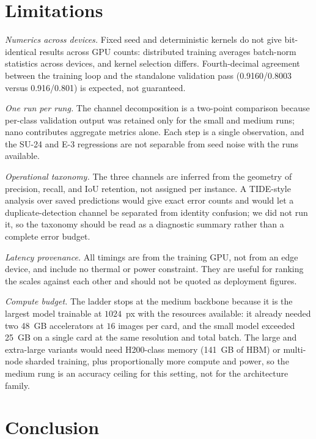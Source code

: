 \documentclass[conference]{IEEEtran}
\begin{document}
\section{Limitations}
\label{sec:limits}

\emph{Numerics across devices.} Fixed seed and deterministic kernels do not give
bit-identical results across GPU counts: distributed training averages batch-norm
statistics across devices, and kernel selection differs. Fourth-decimal agreement
between the training loop and the standalone validation pass (0.9160/0.8003 versus
0.916/0.801) is expected, not guaranteed.

\emph{One run per rung.} The channel decomposition is a two-point comparison
because per-class validation output was retained only for the small and medium
runs; nano contributes aggregate metrics alone. Each step is a single
observation, and the SU-24 and E-3 regressions are not separable from seed noise
with the runs available.

\emph{Operational taxonomy.} The three channels are inferred from the geometry of
precision, recall, and IoU retention, not assigned per instance. A TIDE-style
analysis \cite{bolya2020} over saved predictions would give exact error counts
and would let a duplicate-detection channel be separated from identity confusion;
we did not run it, so the taxonomy should be read as a diagnostic summary rather
than a complete error budget.

\emph{Latency provenance.} All timings are from the training GPU, not from an edge
device, and include no thermal or power constraint. They are useful for ranking
the scales against each other and should not be quoted as deployment figures.

\emph{Compute budget.} The ladder stops at the medium backbone because it is the
largest model trainable at $1024$~px with the resources available: it already
needed two 48~GB accelerators at $16$ images per card, and the small model
exceeded 25~GB on a single card at the same resolution and total batch. The large
and extra-large variants would need H200-class memory (141~GB of HBM) or
multi-node sharded training, plus proportionally more compute and power, so the
medium rung is an accuracy ceiling for this setting, not for the architecture
family.

\section{Conclusion}
\label{sec:concl}
\end{document}
